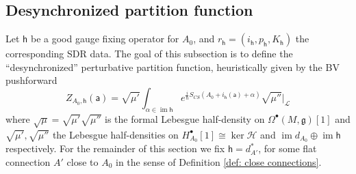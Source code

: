 \documentclass[11pt,a4paper]{amsart}
\theoremstyle{plain} %
\theoremstyle{definition}
\newtheorem{defn}[thm]{Definition}
\theoremstyle{remark}
\newtheorem{rem}[thm]{Remark}
\newcommand{\g}{\mathfrak{g}}
\newcommand{\im}{\operatorname{im}}
\newcommand{\mr}{\mathrm}
\newcommand{\calL}{\mathcal{L}}
\newcommand{\sfa}{\mathsf{a}}
\newcommand{\ra}{\rightarrow}
\newcommand{\sh}{\mathsf{h}}
\newcommand{\M}{\mathcal{M}}
\newcommand{\irr}{\mathrm{irr}}
\newcommand{\sm}{\mathrm{sm}}
\newcommand{\HHH}{\mathcal{H}}
\begin{document}
{%

\subsection{Desynchronized partition function}
Let $\sh$ be a good gauge fixing operator for $A_0$, and $r_\sh = (i_\sh,p_\sh,K_\sh)$ the corresponding SDR data. The goal of this subsection is to define the ``desynchronized'' perturbative partition function, heuristically given by the BV pushforward 
\begin{equation}\label{Z desync PI}
    Z_{A_0,\sh}(\sfa) = \sqrt{\mu'}\int_{\alpha \in \operatorname{im} \sh}e^{\frac{i}{\hbar}S_{CS}(A_0+i_\sh(\sfa)+\alpha)}\sqrt{\mu''}\bigg|_\calL
\end{equation}
where $\sqrt{\mu} = \sqrt{\mu'}\sqrt{\mu''}$ is the formal Lebesgue half-density on $\Omega^\bullet(M,\g)[1]$ and $\sqrt{\mu'},\sqrt{\mu''}$ the Lebesgue
half-densities on $H^\bullet_{A_0}[1]
 \cong \ker \HHH$ and $\im d_{A_0} \oplus \im \sh$ respectively. For the remainder of this section we fix $\sh = d^*_{A'}$, for some flat connection $A'$ close to $A_0$ in the sense of Definition \ref{def: close connections}. 
 


}
\end{document}
